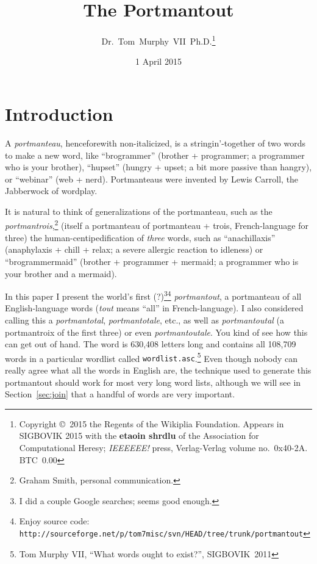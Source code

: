 \documentclass{article}
\begin{document}
 

\title{The Portmantout}
\author{Dr.~Tom~Murphy~VII~Ph.D.\thanks{
Copyright \copyright\ 2015 the Regents of the Wikiplia
Foundation. Appears in SIGBOVIK 2015 with the {\bf etaoin shrdlu} of the
Association for Computational Heresy; {\em IEEEEEE!} press,
Verlag-Verlag volume no.~0x40-2A.
BTC~0.00
}
}

\renewcommand\>{$>$}
\newcommand\<{$<$}

\date{1 April 2015}

\maketitle

\newcommand\foo[1]{%
  \begin{minipage}{7.6in}
  \seqsplit{#1}
  \end{minipage}
  }

\section{Introduction}

A {\em portmanteau}, henceforewith non-italicized, is a
stringin'-together of two words to make a new word, like
``brogrammer'' ({\sf brother} + {\sf programmer}; a programmer who is
your brother), ``hupset'' ({\sf hungry} + {\sf upset}; a bit more
passive than hangry), or ``webinar'' ({\sf web} + {\sf nerd}).
Portmanteaus were invented by Lewis Carroll, the Jabberwock of
wordplay.

It is natural to think of generalizations of the portmanteau, such as
the {\em portmantrois},\!\footnote{Graham Smith, personal
  communication.} (itself a portmanteau of {\sf portmanteau} + {\sf
  trois}, French-language for three) the human-centipedification of
{\em three} words, such as ``anachillaxis'' ({\sf anaphylaxis} + {\sf
  chill} + {\sf relax}; a severe allergic reaction to idleness) or
``brogrammermaid'' ({\sf brother} + {\sf programmer} + {\sf mermaid};
a programmer who is your brother and a mermaid).

In this paper I present the world's first (?)\footnote{I did a couple
  Google searches; seems good enough.}\footnote{Enjoy source code: {\tt http://sourceforge.net/p/tom7misc/svn/HEAD/tree/trunk/portmantout}} {\em portmantout}, a
portmanteau of all English-language words ({\em tout} means ``all'' in
French-language). I also considered calling this a {\em portmantotal},
{\em portmantotale}, etc., as well as {\em portmantoutal} (a
portmantroix of the first three) or even {\em portmantoutale}. You
kind of see how this can get out of hand. The word is
630,408
letters long and contains all 108,709 words in a particular wordlist
called {\tt wordlist.asc}.\footnote{Tom Murphy VII, ``What words ought
  to exist?'', SIGBOVIK~2011} Even though nobody can really agree
what all the words in English are, the technique used to generate this
portmantout should work for most very long word lists, although we will
see in Section~\ref{sec:join} that a handful of words are very important.
\end{document}
